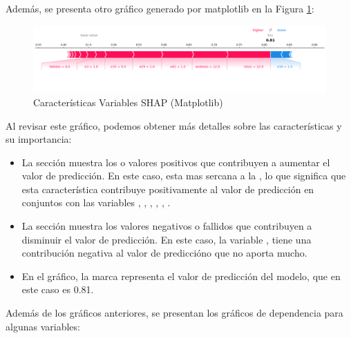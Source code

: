 Además, se presenta otro gráfico generado por matplotlib en la Figura \ref{fig:caract_var_shap_mat}:

\begin{figure}[H]
    \centering
    \includegraphics[width=1\textwidth]{img/shap_rf/shapForcePlot.png}
    \caption{Características Variables SHAP (Matplotlib)}
    \label{fig:caract_var_shap_mat}
\end{figure}

Al revisar este gráfico, podemos obtener más detalles sobre las características y su importancia:

\begin{itemize}
    \item La sección  muestra los  o valores positivos que contribuyen a aumentar el valor de predicción. En este caso,  esta mas sercana a la , lo que significa que esta característica contribuye positivamente al valor de predicción en conjuntos con las variables , , , , , .
    \item La sección  muestra los valores negativos o fallidos que contribuyen a disminuir el valor de predicción. En este caso, la variable , tiene una contribución negativa al valor de prediccióno que no aporta mucho.
    \item En el gráfico, la marca  representa el valor de predicción del modelo, que en este caso es 0.81.
\end{itemize}

Además de los gráficos anteriores, se presentan los gráficos de dependencia para algunas variables:

